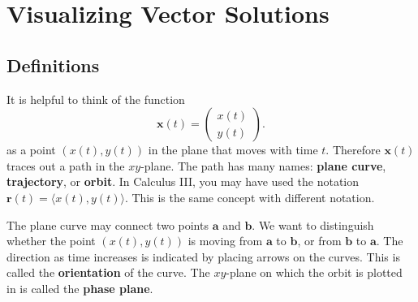 \documentclass[11pt,letterpaper]{article}
\begin{document}


\section{Visualizing Vector Solutions}

\subsection{Definitions}

It is helpful to think of the function 
\[
\mathbf{x}(t)=
\begin{pmatrix}
x(t)\\y(t)
\end{pmatrix}.
\]
as a point $(x(t),y(t))$ in the plane that moves with time $t$. Therefore $\textbf{x}(t)$ traces out a path in the $xy$-plane. The path has many names: \textbf{plane curve}, \textbf{trajectory}, or \textbf{orbit}. In Calculus III, you may have used the notation $\mathbf{r}(t)=\langle x(t),y(t)\rangle$. This is the same concept with different notation.

The plane curve may connect two points $\textbf{a}$ and $\textbf{b}$. We want to distinguish whether the point $(x(t),y(t))$ is moving from $\textbf{a}$ to $\textbf{b}$, or from $\textbf{b}$ to $\textbf{a}$.  The direction as time increases is indicated by placing arrows on the curves. This is called the \textbf{orientation} of the curve. The $xy$-plane on which the orbit is plotted in is called the \textbf{phase plane}.
\end{document}
